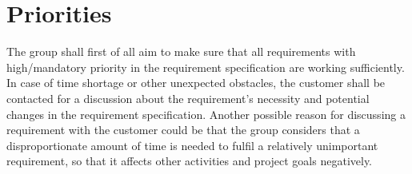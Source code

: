\section{Priorities}
The group shall first of all aim to make sure that all requirements with high/mandatory priority in the requirement specification are working sufficiently. In case of time shortage or other unexpected obstacles, the customer shall be contacted for a discussion about the requirement’s necessity and potential changes in the requirement specification. Another possible reason for discussing a requirement with the customer could be that the group considers that a disproportionate amount of time is needed to fulfil a relatively unimportant requirement, so that it affects other activities and project goals negatively.
